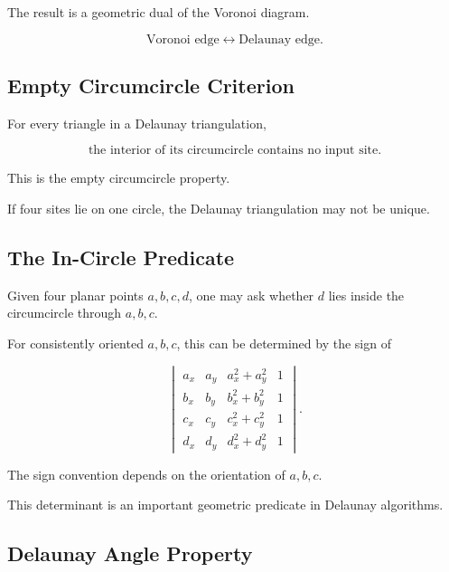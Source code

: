The result is a geometric dual of the Voronoi diagram.

\[
\boxed{
\text{Voronoi edge}
\longleftrightarrow
\text{Delaunay edge}.
}
\]

\subsection{Empty Circumcircle Criterion}
\label{subsec:empty-circumcircle-computational}

For every triangle in a Delaunay triangulation,

\[
\boxed{
\text{the interior of its circumcircle contains no input site}.
}
\]

This is the empty circumcircle property.

If four sites lie on one circle, the Delaunay triangulation may not be
unique.

\subsection{The In-Circle Predicate}
\label{subsec:incircle-predicate}

Given four planar points \(a,b,c,d\), one may ask whether \(d\) lies inside
the circumcircle through \(a,b,c\).

For consistently oriented \(a,b,c\), this can be determined by the sign of

\[
\boxed{
\begin{vmatrix}
a_x & a_y & a_x^2+a_y^2 & 1\\
b_x & b_y & b_x^2+b_y^2 & 1\\
c_x & c_y & c_x^2+c_y^2 & 1\\
d_x & d_y & d_x^2+d_y^2 & 1
\end{vmatrix}.
}
\]

The sign convention depends on the orientation of \(a,b,c\).

This determinant is an important geometric predicate in Delaunay algorithms.

\subsection{Delaunay Angle Property}
\label{subsec:delaunay-angle-property}

